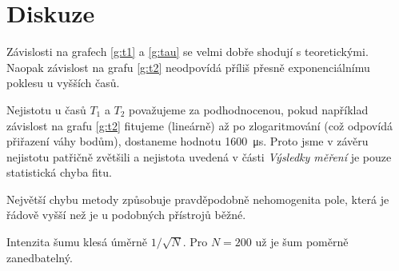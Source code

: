 \section*{Diskuze}

Závislosti na grafech \ref{g:t1} a \ref{g:tau} se velmi dobře shodují s teoretickými.
Naopak závislost na grafu \ref{g:t2} neodpovídá příliš přesně exponenciálnímu poklesu u vyšších časů.

Nejistotu u časů $T_1$ a $T_2$ považujeme za podhodnocenou, pokud například závislost na grafu \ref{g:t2} fitujeme (lineárně) až po zlogaritmování (což odpovídá přiřazení váhy bodům), dostaneme hodnotu \SI{1600}{\us}. Proto jsme v závěru nejistotu patřičně zvětšili a nejistota uvedená v části \emph{Výsledky měření} je pouze statistická chyba fitu.

Největší chybu metody způsobuje pravděpodobně nehomogenita pole, která je řádově vyšší než je u podobných přístrojů běžné.

Intenzita šumu klesá úměrně $1/\sqrt{N}$. Pro $N=200$ už je šum poměrně zanedbatelný.